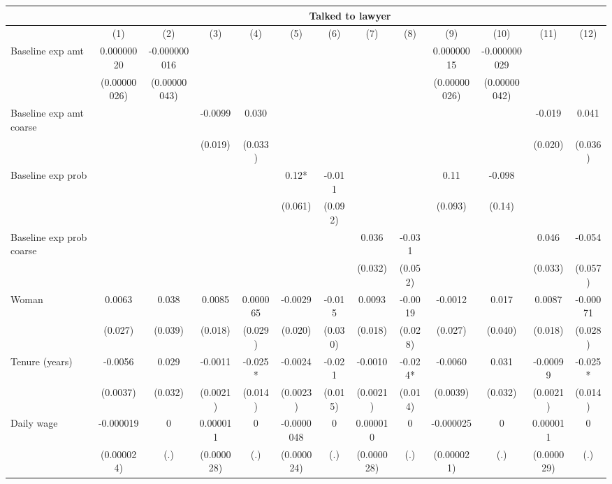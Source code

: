 \begin{tabular}{lcccccccccccc}
\toprule
      & \multicolumn{12}{c}{Talked to lawyer} \\
\midrule
\midrule
      & (1)   & (2)   & (3)   & (4)   & (5)   & (6)   & (7)   & (8)   & (9)   & (10)  & (11)  & (12) \\
\midrule
\midrule
Baseline exp amt & 0.00000020 & -0.000000016 &       &       &       &       &       &       & 0.00000015 & -0.000000029 &       &  \\
      & (0.00000026) & (0.00000043) &       &       &       &       &       &       & (0.00000026) & (0.00000042) &       &  \\
Baseline exp amt coarse &       &       & -0.0099 & 0.030 &       &       &       &       &       &       & -0.019 & 0.041 \\
      &       &       & (0.019) & (0.033) &       &       &       &       &       &       & (0.020) & (0.036) \\
Baseline exp prob &       &       &       &       & 0.12* & -0.011 &       &       & 0.11  & -0.098 &       &  \\
      &       &       &       &       & (0.061) & (0.092) &       &       & (0.093) & (0.14) &       &  \\
Baseline exp prob coarse &       &       &       &       &       &       & 0.036 & -0.031 &       &       & 0.046 & -0.054 \\
      &       &       &       &       &       &       & (0.032) & (0.052) &       &       & (0.033) & (0.057) \\
Woman & 0.0063 & 0.038 & 0.0085 & 0.000065 & -0.0029 & -0.015 & 0.0093 & -0.0019 & -0.0012 & 0.017 & 0.0087 & -0.00071 \\
      & (0.027) & (0.039) & (0.018) & (0.029) & (0.020) & (0.030) & (0.018) & (0.028) & (0.027) & (0.040) & (0.018) & (0.028) \\
Tenure (years) & -0.0056 & 0.029 & -0.0011 & -0.025* & -0.0024 & -0.021 & -0.0010 & -0.024* & -0.0060 & 0.031 & -0.00099 & -0.025* \\
      & (0.0037) & (0.032) & (0.0021) & (0.014) & (0.0023) & (0.015) & (0.0021) & (0.014) & (0.0039) & (0.032) & (0.0021) & (0.014) \\
Daily wage & -0.000019 & 0     & 0.000011 & 0     & -0.0000048 & 0     & 0.000010 & 0     & -0.000025 & 0     & 0.000011 & 0 \\
      & (0.000024) & (.)   & (0.000028) & (.)   & (0.000024) & (.)   & (0.000028) & (.)   & (0.000021) & (.)   & (0.000029) & (.) \\

\end{tabular}
